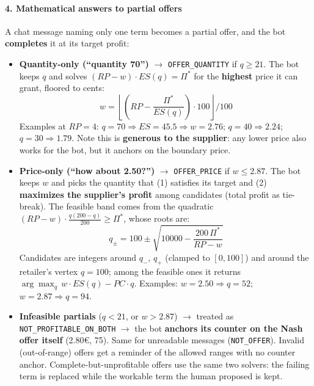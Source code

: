 \paragraph*{4. Mathematical answers to partial offers}
A chat message naming only one term becomes a partial offer, and the bot
\textbf{completes} it at its target profit:
\begin{itemize}
    \item \textbf{Quantity-only (``quantity 70'')} $\rightarrow$
    \texttt{OFFER\_QUANTITY} if $q \ge 21$. The bot keeps $q$ and solves
    $(RP - w)\cdot ES(q) = \Pi^*$ for the \textbf{highest} price it can
    grant, floored to cents:
    $$ w = \left\lfloor \left(RP - \frac{\Pi^*}{ES(q)}\right)\cdot 100
       \right\rfloor / 100 $$
    Examples at $RP=4$: $q=70 \Rightarrow ES=45.5 \Rightarrow w = 2.76$;
    $q=40 \Rightarrow 2.24$; $q=30 \Rightarrow 1.79$. Note this is
    \textbf{generous to the supplier}: any lower price also works for the
    bot, but it anchors on the boundary price.

    \item \textbf{Price-only (``how about 2.50?'')} $\rightarrow$
    \texttt{OFFER\_PRICE} if $w \le 2.87$. The bot keeps $w$ and picks the
    quantity that (1) satisfies its target and (2) \textbf{maximizes the
    supplier's profit} among candidates (total profit as tie-break). The
    feasible band comes from the quadratic
    $(RP-w)\cdot\frac{q(200-q)}{200} \ge \Pi^*$, whose roots are:
    $$ q_{\pm} = 100 \pm \sqrt{10000 - \frac{200\,\Pi^*}{RP - w}} $$
    Candidates are integers around $q_-$, $q_+$ (clamped to $[0,100]$) and
    around the retailer's vertex $q=100$; among the feasible ones it
    returns $\arg\max_q\, w\cdot ES(q) - PC\cdot q$. Examples:
    $w=2.50 \Rightarrow q=52$; $w=2.87 \Rightarrow q=94$.

    \item \textbf{Infeasible partials} ($q<21$, or $w>2.87$) $\rightarrow$
    treated as \texttt{NOT\_PROFITABLE\_ON\_BOTH} $\rightarrow$ the bot
    \textbf{anchors its counter on the Nash offer itself} (2.80€, 75).
    Same for unreadable messages (\texttt{NOT\_OFFER}). Invalid
    (out-of-range) offers get a reminder of the allowed ranges with no
    counter anchor. Complete-but-unprofitable offers use the same two
    solvers: the failing term is replaced while the workable term the
    human proposed is kept.
\end{itemize}

